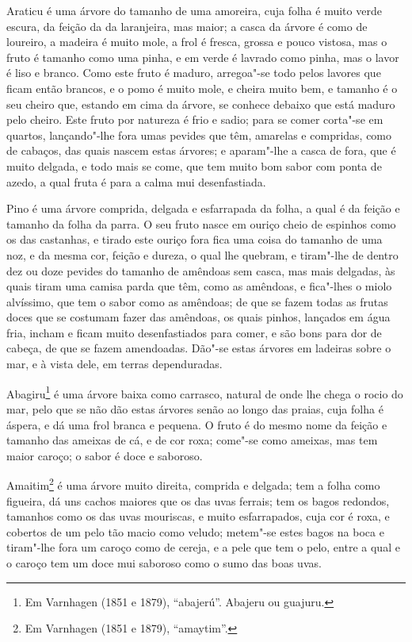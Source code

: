 \begin{linenumbers}
Araticu é uma árvore do tamanho de uma amoreira, cuja folha é muito verde escura, da
feição da da laranjeira, mas maior; a casca da árvore é como de loureiro, a madeira é
muito mole, a frol é fresca, grossa e pouco vistosa, mas o fruto é tamanho como uma pinha,
e em verde é lavrado como pinha, mas o lavor é liso e branco. Como este fruto é maduro,
arregoa"-se todo pelos lavores que ficam então brancos, e o pomo é muito mole, e cheira
muito bem, e tamanho é o seu cheiro que, estando em cima da árvore, se conhece debaixo que
está maduro pelo cheiro. Este fruto por natureza é frio e sadio; para se comer corta"-se em
quartos, lançando"-lhe fora umas pevides que têm, amarelas e compridas, como de cabaços,
das quais nascem estas árvores; e aparam"-lhe a casca de fora, que é muito delgada, e todo
mais se come, que tem muito bom sabor com ponta de azedo, a qual fruta é para a calma mui
desenfastiada.

Pino é uma árvore comprida, delgada e esfarrapada da folha, a qual é da feição e tamanho
da folha da parra. O seu fruto nasce em ouriço cheio de espinhos como os das castanhas, e
tirado este ouriço fora fica uma coisa do tamanho de uma noz, e da mesma cor, feição e
dureza, o qual lhe quebram, e tiram"-lhe de dentro dez ou doze pevides do tamanho de
amêndoas sem casca, mas mais delgadas, às quais tiram uma camisa parda que têm, como as
amêndoas, e fica"-lhes o miolo alvíssimo, que tem o sabor como as amêndoas; de que se fazem
todas as frutas doces que se costumam fazer das amêndoas, os quais pinhos, lançados em
água fria, incham e ficam muito desenfastiados para comer, e são bons para dor de cabeça,
de que se fazem amendoadas. Dão"-se estas árvores em ladeiras sobre o mar, e à vista dele,
em terras dependuradas.

Abagiru\footnote{ Em Varnhagen (1851 e 1879), ``abajerú''. Abajeru ou guajuru.} é uma
árvore baixa como carrasco, natural de onde lhe chega o rocio do mar, pelo que se não dão
estas árvores senão ao longo das praias, cuja folha é áspera, e dá uma frol branca e
pequena. O fruto é do mesmo nome da feição e tamanho das ameixas de cá, e de cor roxa;
come"-se como ameixas, mas tem maior caroço; o sabor é doce e saboroso.

Amaitim\footnote{ Em Varnhagen (1851 e 1879), ``amaytim''.} é uma árvore muito direita,
comprida e delgada; tem a folha como figueira, dá uns cachos maiores que os das uvas
ferrais; tem os bagos redondos, tamanhos como os das uvas mouriscas, e muito esfarrapados,
cuja cor é roxa, e cobertos de um pelo tão macio como veludo; metem"-se estes bagos na boca
e tiram"-lhe fora um caroço como de cereja, e a pele que tem o pelo, entre a qual e o
caroço tem um doce mui saboroso como o sumo das boas uvas.


\end{linenumbers}
